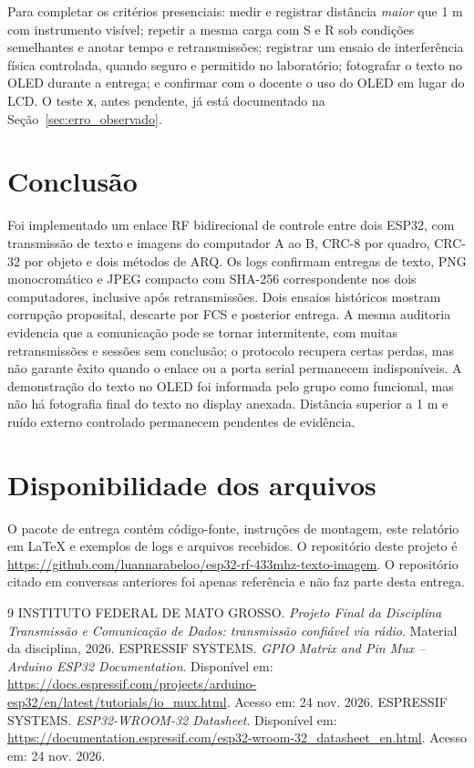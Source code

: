 \documentclass[12pt,a4paper]{article}
\begin{document}
Para completar os critérios presenciais: medir e registrar distância \emph{maior} que 1 m com instrumento visível; repetir a mesma carga com S e R sob condições semelhantes e anotar tempo e retransmissões; registrar um ensaio de interferência física controlada, quando seguro e permitido no laboratório; fotografar o texto no OLED durante a entrega; e confirmar com o docente o uso do OLED em lugar do LCD. O teste \texttt{x}, antes pendente, já está documentado na Seção~\ref{sec:erro_observado}.

\section{Conclusão}
Foi implementado um enlace RF bidirecional de controle entre dois ESP32, com transmissão de texto e imagens do computador A ao B, CRC-8 por quadro, CRC-32 por objeto e dois métodos de ARQ. Os logs confirmam entregas de texto, PNG monocromático e JPEG compacto com SHA-256 correspondente nos dois computadores, inclusive após retransmissões. Dois ensaios históricos mostram corrupção proposital, descarte por FCS e posterior entrega. A mesma auditoria evidencia que a comunicação pode se tornar intermitente, com muitas retransmissões e sessões sem conclusão; o protocolo recupera certas perdas, mas não garante êxito quando o enlace ou a porta serial permanecem indisponíveis. A demonstração do texto no OLED foi informada pelo grupo como funcional, mas não há fotografia final do texto no display anexada. Distância superior a 1 m e ruído externo controlado permanecem pendentes de evidência.

\section{Disponibilidade dos arquivos}
O pacote de entrega contém código-fonte, instruções de montagem, este relatório em LaTeX e exemplos de logs e arquivos recebidos. O repositório deste projeto é \url{https://github.com/luannarabeloo/esp32-rf-433mhz-texto-imagem}. O repositório citado em conversas anteriores foi apenas referência e não faz parte desta entrega.

\begin{thebibliography}{9}
 INSTITUTO FEDERAL DE MATO GROSSO. \emph{Projeto Final da Disciplina Transmissão e Comunicação de Dados: transmissão confiável via rádio}. Material da disciplina, 2026.
 ESPRESSIF SYSTEMS. \emph{GPIO Matrix and Pin Mux -- Arduino ESP32 Documentation}. Disponível em: \url{https://docs.espressif.com/projects/arduino-esp32/en/latest/tutorials/io_mux.html}. Acesso em: 24 nov. 2026.
 ESPRESSIF SYSTEMS. \emph{ESP32-WROOM-32 Datasheet}. Disponível em: \url{https://documentation.espressif.com/esp32-wroom-32_datasheet_en.html}. Acesso em: 24 nov. 2026.
\end{thebibliography}
\end{document}
